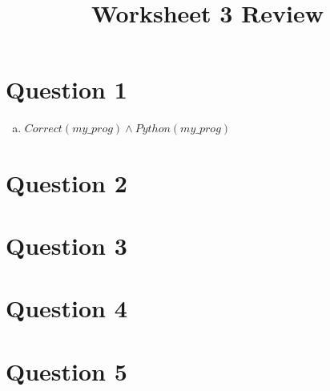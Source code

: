 \documentclass[12pt]{article}
\begin{document}
\title{Worksheet 3 Review}
\maketitle

\section*{Question 1}
\begin{enumerate}[a.]
    \item

    $Correct(my\_prog) \land Python(my\_prog)$
\end{enumerate}

\section*{Question 2}

\section*{Question 3}

\section*{Question 4}

\section*{Question 5}
\end{document}

